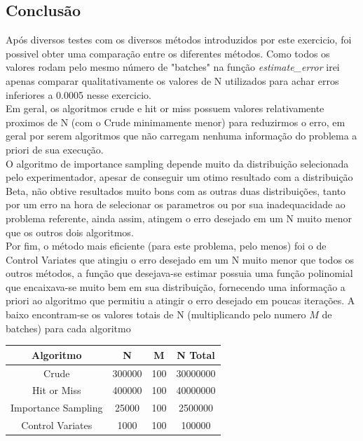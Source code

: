 \documentclass[twocolumn,amsmath,amssymb,floatfix]{revtex4}
\begin{document}
\subsection{Conclusão}
Após diversos testes com os diversos métodos introduzidos por este exercicio, foi possivel obter uma comparação entre os diferentes métodos. Como todos os valores rodam pelo mesmo número de "batches" na função \textit{estimate\_error} irei apenas comparar qualitativamente os valores de N utilizados para achar erros inferiores a 0.0005 nesse exercicio. \\
\indent Em geral, os algoritmos crude e hit or miss possuem valores relativamente proximos de N (com o Crude minimamente menor)  para reduzirmos o erro, em geral por serem algoritmos que não carregam nenhuma informação do problema a priori de sua execução. \\
\indent O algoritmo de importance sampling depende muito da distribuição selecionada pelo experimentador, apesar de conseguir um otimo resultado com a distribuição Beta, não obtive resultados muito bons com as outras duas distribuições, tanto por um erro na hora de selecionar os parametros ou por sua inadequacidade ao problema referente, ainda assim, atingem o erro desejado em um N muito menor que os outros dois algoritmos. \\
\indent Por fim, o método mais eficiente (para este problema, pelo menos) foi o de Control Variates que atingiu o erro desejado em um N muito menor que todos os outros métodos, a função que desejava-se estimar possuia uma função polinomial que encaixava-se muito bem em sua distribuição, fornecendo uma informação a priori ao algoritmo que permitiu a atingir o erro desejado em poucas iterações.
\indent A baixo encontram-se os valores totais de N (multiplicando pelo numero $M$ de batches) para cada algoritmo
\begin{center}
 \begin{tabular}{||c c c c||} 
 \hline
 Algoritmo & N & M & N Total \\ [0.5ex] 
 \hline\hline
 Crude & 300000 & 100 & 30000000 \\ 
 \hline
 Hit or Miss & 400000 & 100 & 40000000 \\
 \hline
 Importance Sampling & 25000 & 100 & 2500000 \\
 \hline
 Control Variates & 1000 & 100 & 100000 \\
 \hline
\end{tabular}
\end{center}
\end{document}
